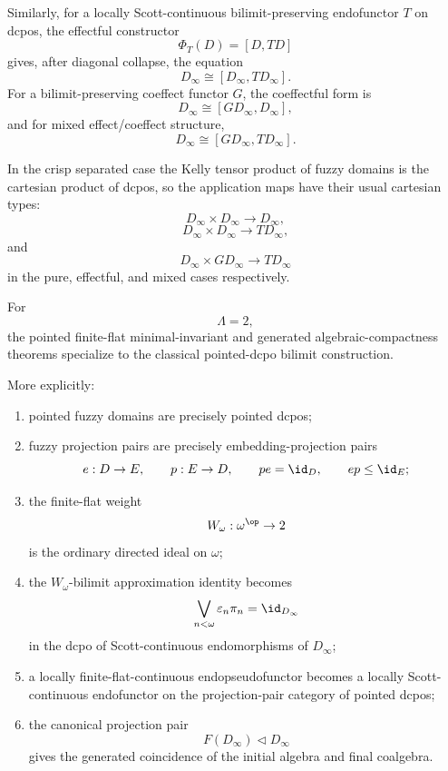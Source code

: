 Similarly, for a locally Scott-continuous bilimit-preserving endofunctor \(T\)
on dcpos, the effectful constructor
\[
    \Phi_T(D)=[D,TD]
\]
gives, after diagonal collapse, the equation
\[
    D_\infty\cong [D_\infty,TD_\infty].
\]
For a bilimit-preserving coeffect functor \(G\), the coeffectful form is
\[
    D_\infty\cong [GD_\infty,D_\infty],
\]
and for mixed effect/coeffect structure,
\[
    D_\infty\cong [GD_\infty,TD_\infty].
\]

In the crisp separated case the Kelly tensor product of fuzzy domains is the
cartesian product of dcpos, so the application maps have their usual cartesian
types:
\[
    D_\infty\times D_\infty\to D_\infty,
\]
\[
    D_\infty\times D_\infty\to TD_\infty,
\]
and
\[
    D_\infty\times GD_\infty\to TD_\infty
\]
in the pure, effectful, and mixed cases respectively.

\begin{proposition}
\label{prop:crisp-separated-pointed-minimal-invariants}
For
\[
    \Lambda=2,
\]
the pointed finite-flat minimal-invariant and generated algebraic-compactness
theorems specialize to the classical pointed-dcpo bilimit construction.

More explicitly:

\begin{enumerate}
    \item pointed fuzzy domains are precisely pointed dcpos;

    \item fuzzy projection pairs are precisely embedding-projection pairs
    \[
        e:D\to E,
        \qquad
        p:E\to D,
        \qquad
        pe=\id_D,
        \qquad
        ep\leq\id_E;
    \]

    \item the finite-flat weight
    \[
        W_\omega:\omega^{\op}\to 2
    \]
    is the ordinary directed ideal on \(\omega\);

    \item the \(W_\omega\)-bilimit approximation identity becomes
    \[
        \bigvee_{n<\omega}\varepsilon_n\pi_n
        =
        \id_{D_\infty}
    \]
    in the dcpo of Scott-continuous endomorphisms of \(D_\infty\);

    \item a locally finite-flat-continuous endopseudofunctor becomes a locally
    Scott-continuous endofunctor on the projection-pair category of pointed
    dcpos;

    \item the canonical projection pair
    \[
        F(D_\infty)\triangleleft D_\infty
    \]
    gives the generated coincidence of the initial algebra and final coalgebra.
\end{enumerate}
\end{proposition}

